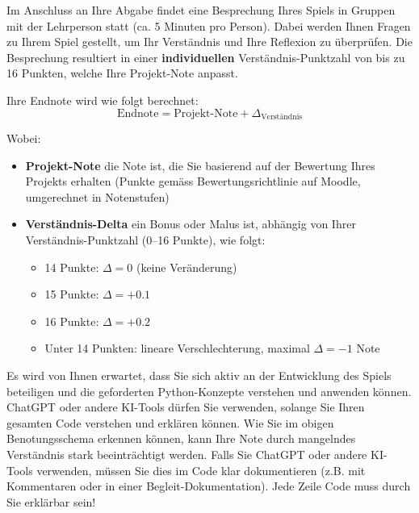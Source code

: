 \begin{landscape}
\begin{minipage}{.7\linewidth}
Im Anschluss an Ihre Abgabe findet eine Besprechung Ihres Spiels in Gruppen mit der Lehrperson statt (ca. 5 Minuten pro Person). Dabei werden Ihnen Fragen zu Ihrem Spiel gestellt, um Ihr Verständnis und Ihre Reflexion zu überprüfen. Die Besprechung resultiert in einer \textbf{individuellen} Verständnis-Punktzahl von bis zu 16 Punkten, welche Ihre Projekt-Note anpasst.

Ihre Endnote wird wie folgt berechnet:
\[\text{Endnote} = \text{Projekt-Note} + \Delta_{\text{Verständnis}}\]

Wobei:
\begin{itemize}
    \item \textbf{Projekt-Note} die Note ist, die Sie basierend auf der Bewertung Ihres Projekts erhalten (Punkte gemäss Bewertungsrichtlinie auf Moodle, umgerechnet in Notenstufen)
    \item \textbf{Verständnis-Delta} ein Bonus oder Malus ist, abhängig von Ihrer Verständnis-Punktzahl (0--16 Punkte), wie folgt:
    \begin{itemize}
        \item 14 Punkte: $\Delta = 0$ (keine Veränderung)
        \item 15 Punkte: $\Delta = +0.1$
        \item 16 Punkte: $\Delta = +0.2$
        \item Unter 14 Punkten: lineare Verschlechterung, maximal $\Delta = -1$ Note
    \end{itemize}
\end{itemize}

\begin{myattention}[KI-Tools]
    Es wird von Ihnen erwartet, dass Sie sich aktiv an der Entwicklung des Spiels beteiligen und die geforderten Python-Konzepte verstehen und anwenden können. ChatGPT oder andere KI-Tools dürfen Sie verwenden, solange Sie Ihren gesamten Code verstehen und erklären können. Wie Sie im obigen Benotungsschema erkennen können, kann Ihre Note durch mangelndes Verständnis stark beeinträchtigt werden. Falls Sie ChatGPT oder andere KI-Tools verwenden, müssen Sie dies im Code klar dokumentieren (z.B. mit Kommentaren oder in einer Begleit-Dokumentation). Jede Zeile Code muss durch Sie erklärbar sein!
\end{myattention}
    \end{minipage}

\end{landscape}
\restoregeometry
